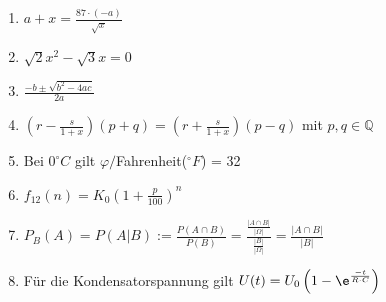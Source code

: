\begin{enumerate}
\item $a+x=\frac{87\cdot(-a)}{\sqrt{x}}$
\item $\sqrt{2}x^2 - \sqrt{3}x = 0$
\item $\frac{-b \pm \sqrt{b^2-4ac}}{2a}$
\item
$\left(r-\frac{s}{1+x}\right)(p+q)=\left(r+\frac{s}{1+x}\right)(p-q)$
mit $p, q \in \mathbb{Q}$
\item Bei $0^{\circ}C$ gilt $\varphi/$Fahrenheit($^\circ{}F$) =
32
\item $f_{12}(n) = K_0\left(1+\frac{p}{100}\right)^n$
\item $P_B(A)=P(A|B) := \frac{P(A\cap{}B)}{P(B)}
= \frac{\frac{|A\cap{}B|}{|\Omega|}}{\frac{|B|}{|\Omega|}} = \frac{|A\cap{}B|}{|B|}$
\item Für die Kondensatorspannung gilt $U(t) = U_0\left(1-\e^{\frac{-t}{R\cdot{}C}}\right)$
\end{enumerate}



